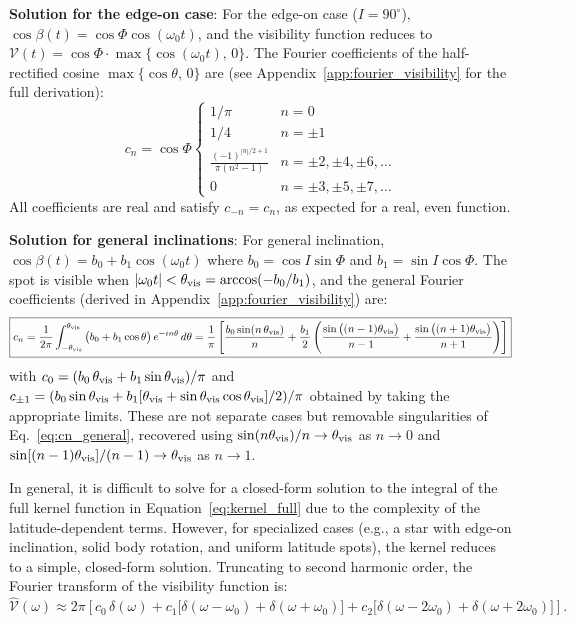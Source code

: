 \documentclass[preprint]{aastex702}
\newcommand{\FT}[1]{\hat{#1}}
\begin{document}
\textbf{Solution for the edge-on case}: For the edge-on case ($I = 90^\circ$), $\cos\beta(t) = \cos\Phi\cos(\omega_0 t)$, and the visibility function reduces to $\mathcal{V}(t) = \cos\Phi \cdot \max\{\cos(\omega_0 t),\, 0\}$. The Fourier coefficients of the half-rectified cosine $\max\{\cos\theta,\,0\}$ are (see Appendix~\ref{app:fourier_visibility} for the full derivation):
\begin{equation}
    c_n =
    \cos\Phi
    \begin{cases}
        1 / \pi & n = 0 \\[4pt]
        1 / 4 & n = \pm 1 \\[4pt]
        \displaystyle \frac{(-1)^{|n|/2+1}}{\pi(n^2 - 1)} & n = \pm 2, \pm 4, \pm 6, \ldots \\[6pt]
        0 & n = \pm 3, \pm 5, \pm 7, \ldots
    \end{cases}
    \label{eq:cn_edgeon}
\end{equation}
All coefficients are real and satisfy $c_{-n} = c_n$, as expected for a real, even function.

\textbf{Solution for general inclinations}: For general inclination, $\cos\beta(t) = b_0 + b_1\cos(\omega_0 t)$ where $b_0 = \cos I\sin\Phi$ and $b_1 = \sin I\cos\Phi$. The spot is visible when $|\omega_0 t| < \theta_{\rm vis} = \arccos(-b_0/b_1)$, and the general Fourier coefficients (derived in Appendix~\ref{app:fourier_visibility}) are:
\begin{equation}
    \boxed{
    c_n = \frac{1}{2\pi}\int_{-\theta_{\rm vis}}^{\theta_{\rm vis}} \big(b_0 + b_1\cos\theta\big)\, e^{-in\theta}\, d\theta
    = \frac{1}{\pi}\left[\frac{b_0\sin(n\,\theta_{\rm vis})}{n} + \frac{b_1}{2}\left(\frac{\sin\big((n-1)\theta_{\rm vis}\big)}{n-1} + \frac{\sin\big((n+1)\theta_{\rm vis}\big)}{n+1}\right)\right]
    }
    \label{eq:cn_general}
\end{equation}
with $c_0 = (b_0\,\theta_{\rm vis} + b_1\sin\theta_{\rm vis})/\pi$ and $c_{\pm 1} = (b_0\sin\theta_{\rm vis} + b_1[\theta_{\rm vis} + \sin\theta_{\rm vis}\cos\theta_{\rm vis}]/2)/\pi$ obtained by taking the appropriate limits. These are not separate cases but removable singularities of Eq.~\eqref{eq:cn_general}, recovered using $\sin(n\theta_{\rm vis})/n \to \theta_{\rm vis}$ as $n \to 0$ and $\sin[(n-1)\theta_{\rm vis}]/(n-1) \to \theta_{\rm vis}$ as $n \to 1$.

In general, it is difficult to solve for a closed-form solution to the integral of the full kernel function in Equation~\ref{eq:kernel_full} due to the complexity of the latitude-dependent terms. However, for specialized cases (e.g., a star with edge-on inclination, solid body rotation, and uniform latitude spots), the kernel reduces to a simple, closed-form solution. Truncating to second harmonic order, the Fourier transform of the visibility function is:
\begin{equation}
    \FT{\mathcal{V}}(\omega) \approx 2\pi\left[
        c_0\,\delta(\omega)
        + c_1\big[\delta(\omega - \omega_0) + \delta(\omega + \omega_0)\big]
        + c_2\big[\delta(\omega - 2\omega_0) + \delta(\omega + 2\omega_0)\big]
    \right].
    \label{eq:cap_hat_explicit}
\end{equation}
\end{document}
